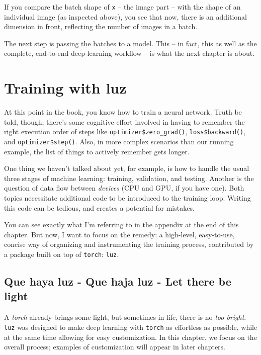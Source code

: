 \documentclass[
  letterpaper,
]{krantz}
\begin{document}
If you compare the batch shape of \texttt{x} -- the image part -- with
the shape of an individual image (as inspected above), you see that now,
there is an additional dimension in front, reflecting the number of
images in a batch.

The next step is passing the batches to a model. This -- in fact, this
as well as the complete, end-to-end deep-learning workflow -- is what
the next chapter is about.

\hypertarget{sec:luz}{%
\chapter{Training with luz}\label{sec:luz}}

At this point in the book, you know how to train a neural network. Truth
be told, though, there's some cognitive effort involved in having to
remember the right execution order of steps like
\texttt{optimizer\$zero\_grad()}, \texttt{loss\$backward()}, and
\texttt{optimizer\$step()}. Also, in more complex scenarios than our
running example, the list of things to actively remember gets longer.

One thing we haven't talked about yet, for example, is how to handle the
usual three stages of machine learning: training, validation, and
testing. Another is the question of data flow between \emph{devices}
(CPU and GPU, if you have one). Both topics necessitate additional code
to be introduced to the training loop. Writing this code can be tedious,
and creates a potential for mistakes.

You can see exactly what I'm referring to in the appendix at the end of
this chapter. But now, I want to focus on the remedy: a high-level,
easy-to-use, concise way of organizing and instrumenting the training
process, contributed by a package built on top of \texttt{torch}:
\texttt{luz}.

\hypertarget{que-haya-luz---que-haja-luz---let-there-be-light}{%
\section{Que haya luz - Que haja luz - Let there be
light}\label{que-haya-luz---que-haja-luz---let-there-be-light}}

A \emph{torch} already brings some light, but sometimes in life, there
is no \emph{too bright}. \texttt{luz} was designed to make deep learning
with \texttt{torch} as effortless as possible, while at the same time
allowing for easy customization. In this chapter, we focus on the
overall process; examples of customization will appear in later
chapters.
\end{document}
